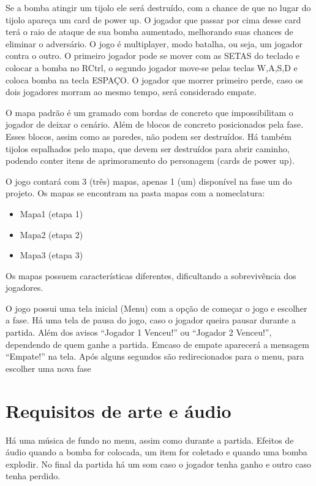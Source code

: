 \documentclass[12pt]{article}
\begin{document}
	Se a bomba atingir um tijolo ele será destruído, com a
	chance de que no lugar do tijolo apareça um card de
	power up. O jogador que passar por cima desse card terá
	o raio de ataque de sua bomba aumentado, melhorando suas
	chances de eliminar o adversário.  O jogo é multiplayer,
	modo batalha, ou seja, um jogador contra o outro. O
	primeiro jogador pode se mover com as SETAS do teclado e
	colocar a bomba no RCtrl, o segundo jogador move-se
	pelas teclas W,A,S,D e coloca bomba na tecla ESPAÇO. O
	jogador que morrer primeiro perde, caso os dois
	jogadores morram ao mesmo tempo, será considerado
	empate.

	O mapa padrão é um gramado com bordas de concreto que
	impossibilitam o jogador de deixar o cenário. Além de
	blocos de concreto posicionados pela fase. Esses blocos,
	assim como as paredes, não podem ser destruídos. Há
	também tijolos espalhados pelo mapa, que devem ser
	destruídos para abrir caminho, podendo conter itens de
	aprimoramento do personagem (cards de power up).

	O jogo contará com 3 (três) mapas, apenas 1 (um)
	disponível na fase um do projeto.  Os mapas se
	encontram na pasta mapas com a nomeclatura:

	\begin{itemize}
		\item Mapa1 (etapa 1)
		\item Mapa2 (etapa 2)
		\item Mapa3 (etapa 3)
	\end{itemize}

	Os mapas possuem características diferentes,
	dificultando a sobrevivência dos jogadores.

	O jogo possui uma tela inicial (Menu) com a opção de
	começar o jogo e escolher a fase. Há uma tela de pausa
	do jogo, caso o jogador queira pausar durante a partida.
	Além dos avisos “Jogador 1 Venceu!” ou “Jogador 2
	Venceu!”, dependendo de quem ganhe a partida. Emcaso de
	empate aparecerá a mensagem “Empate!” na tela. Após
	alguns segundos são redirecionados para o menu, para
	escolher uma nova fase

\section{Requisitos de arte e áudio}

	Há uma música de fundo no menu, assim como durante a
	partida. Efeitos de áudio quando a bomba for colocada,
	um item for coletado e quando uma bomba explodir. No
	final da partida há um som caso o jogador tenha ganho e
	outro caso tenha perdido.
\end{document}
